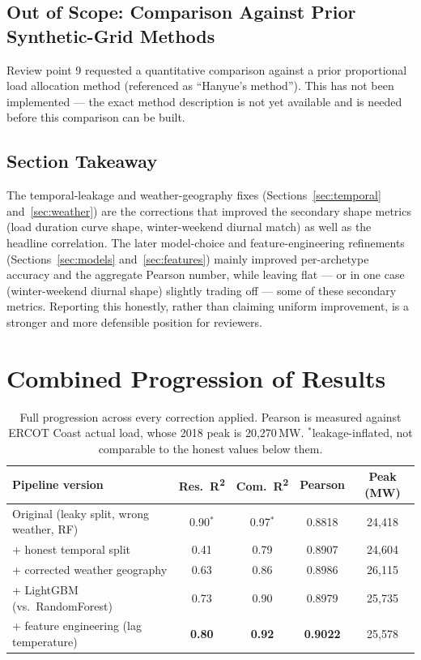 \documentclass[11pt]{article}
\begin{document}
\subsection{Out of Scope: Comparison Against Prior Synthetic-Grid Methods}

Review point 9 requested a quantitative comparison against a prior proportional
load allocation method (referenced as ``Hanyue's method''). This has not been
implemented --- the exact method description is not yet available and is needed before
this comparison can be built.

\subsection{Section Takeaway}

The temporal-leakage and weather-geography fixes (Sections~\ref{sec:temporal}
and~\ref{sec:weather}) are the corrections that improved the secondary shape metrics
(load duration curve shape, winter-weekend diurnal match) as well as the headline
correlation. The later model-choice and feature-engineering refinements
(Sections~\ref{sec:models} and~\ref{sec:features}) mainly improved per-archetype
accuracy and the aggregate Pearson number, while leaving flat --- or in one case
(winter-weekend diurnal shape) slightly trading off --- some of these secondary
metrics. Reporting this honestly, rather than claiming uniform improvement, is a
stronger and more defensible position for reviewers.

\section{Combined Progression of Results}

\begin{table}[H]
\centering
\small
\begin{tabular}{lcccc}
\toprule
Pipeline version & Res.\ R\textsuperscript{2} & Com.\ R\textsuperscript{2} & Pearson & Peak (MW) \\
\midrule
Original (leaky split, wrong weather, RF) & 0.90$^{*}$ & 0.97$^{*}$ & 0.8818 & 24{,}418 \\
+ honest temporal split & 0.41 & 0.79 & 0.8907 & 24{,}604 \\
+ corrected weather geography & 0.63 & 0.86 & 0.8986 & 26{,}115 \\
+ LightGBM (vs.\ RandomForest) & 0.73 & 0.90 & 0.8979 & 25{,}735 \\
+ feature engineering (lag temperature) & \textbf{0.80} & \textbf{0.92} & \textbf{0.9022} & 25{,}578 \\
\bottomrule
\end{tabular}
\caption{Full progression across every correction applied. Pearson is measured against
ERCOT Coast actual load, whose 2018 peak is 20{,}270\,MW. $^{*}$leakage-inflated,
not comparable to the honest values below them.}
\label{tab:progression}
\end{table}
\end{document}
